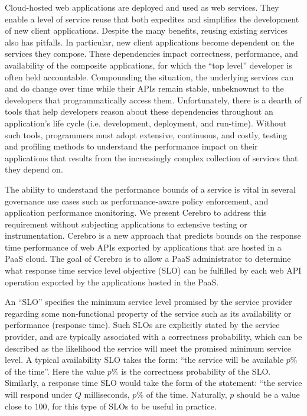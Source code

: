 Cloud-hosted web applications are deployed and used as web services. 
They enable a level of service reuse that both expedites
and simplifies the development of new client applications.
Despite the many benefits, reusing existing services also has pitfalls.  
In particular, new client applications become dependent on the 
services they compose.  These dependencies
impact correctness, performance, and availability of the composite 
applications, for which the ``top level'' developer is often held accountable.  
Compounding the situation, the underlying services can and do change over time
while their APIs remain stable,
unbeknownst to the developers that programmatically access them.
Unfortunately, there is a dearth of tools that help developers reason about these 
dependencies throughout an application's 
life cycle (i.e. development, deployment, and run-time).  Without such tools, 
programmers must adopt extensive, continuous, and costly, testing and profiling methods
to understand the performance impact on their applications
that results from the increasingly complex collection of
services that they depend on. 

The ability to understand the performance bounds
of a service is vital in several governance use cases such as
performance-aware policy enforcement, and application performance monitoring.
We present Cerebro to address this requirement without subjecting applications to extensive
testing or instrumentation. Cerebro is a new approach that 
predicts bounds on the response time performance of web
APIs exported by applications that are hosted in a PaaS cloud.
The goal of Cerebro is to allow 
a PaaS administrator to determine what response time service level objective (SLO) can be
fulfilled by each web API operation exported by the applications
hosted in the PaaS.

An ``SLO'' specifies the minimum service level promised by the
service provider regarding some non-functional property of the service such as
its availability or performance (response time). 
Such SLOs are explicitly
stated by the service provider, and are typically associated with a correctness probability,
which can be described as the likelihood the service will meet the promised
minimum service level. A typical availability SLO
takes the form: ``the service will be available $p\%$ of the time''.
Here the value $p\%$ is the correctness probability of the SLO. Similarly, a
response time SLO would take the form of the statement: ``the service will respond 
under $Q$ milliseconds, $p\%$ of the time. Naturally, $p$ should be a value close
to $100$, for this type of SLOs to be useful in practice.

